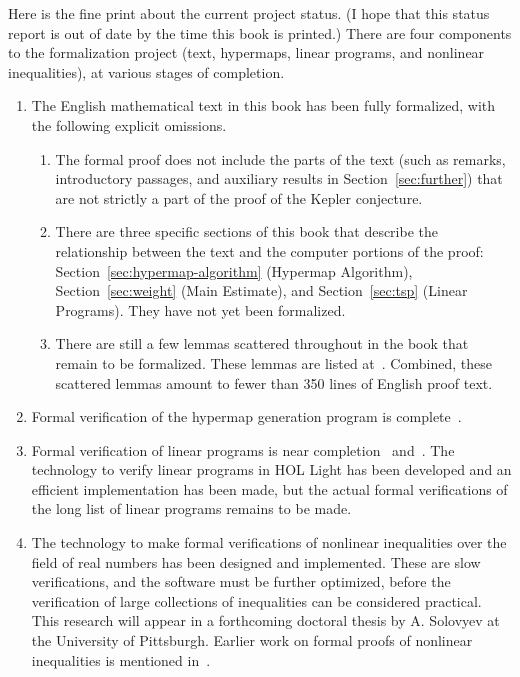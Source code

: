 Here is the fine print about the current project status. (I hope that
this status report is out of date by the time this book is printed.)
There are four components to the formalization project (text, hypermaps, linear programs,
and nonlinear inequalities), at various stages of completion.
\begin{enumerate}
\item
The English mathematical text in this book has been fully
  formalized, with the following explicit omissions.
\begin{enumerate}
\item The formal proof does not include the parts of the text (such
  as remarks, introductory passages, and auxiliary results in 
  Section~\ref{sec:further}) that are
  not strictly a part of the proof of the Kepler conjecture.
\item There are three specific sections of this book that describe
  the relationship between the text and the computer portions of
  the proof: Section~\ref{sec:hypermap-algorithm} (Hypermap Algorithm), 
  Section~\ref{sec:weight} (Main Estimate), and Section~\ref{sec:tsp} (Linear Programs).
  They have not yet been formalized.
\item There are still a few lemmas scattered throughout in the book that remain to be formalized.
These lemmas are listed at~\cite{website:FlyspeckProject}.
Combined, these scattered lemmas amount to fewer than 350 lines of English proof text.
\end{enumerate}
\item Formal verification of the hypermap generation program is complete~\cite{Nipkow:2005:Tame}.
\item Formal verification of linear programs is near 
completion~\cite{Obua:2005:Thesis} and~\cite{Solovyev:LP}.
 The technology to verify linear programs in HOL Light has been developed and 
  an efficient implementation has been made, but the actual formal verifications of the
  long list of linear programs remains to be made.
\item The technology to make formal verifications of nonlinear inequalities over the
field of real numbers has been designed and implemented.   These are slow verifications,
and the software must be further optimized, before the verification of large collections
of inequalities can be considered practical.  This research will appear in a forthcoming doctoral 
thesis by A. Solovyev
at the University of Pittsburgh.  Earlier work on formal proofs of nonlinear inequalities
is mentioned in~\cite{HHMNOZ}.
\end{enumerate}


